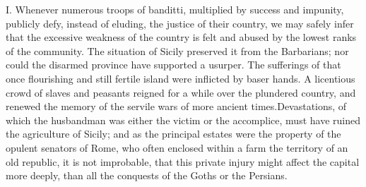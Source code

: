 I. Whenever numerous troops of banditti, multiplied by success
and impunity, publicly defy, instead of eluding, the justice of
their country, we may safely infer that the excessive weakness of
the country is felt and abused by the lowest ranks of the
community. The situation of Sicily preserved it from the
Barbarians; nor could the disarmed province have supported a
usurper. The sufferings of that once flourishing and still
fertile island were inflicted by baser hands. A licentious crowd
of slaves and peasants reigned for a while over the plundered
country, and renewed the memory of the servile wars of more
ancient times.\footnotemark[169] Devastations, of which the husbandman was
either the victim or the accomplice, must have ruined the
agriculture of Sicily; and as the principal estates were the
property of the opulent senators of Rome, who often enclosed
within a farm the territory of an old republic, it is not
improbable, that this private injury might affect the capital
more deeply, than all the conquests of the Goths or the Persians.


